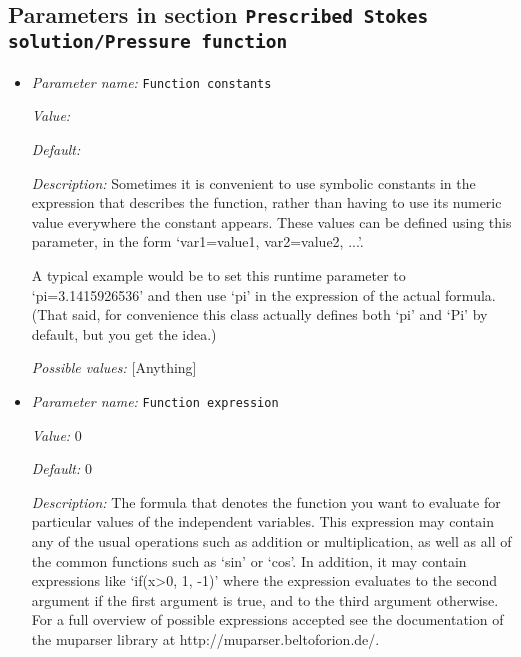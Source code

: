 \subsection{Parameters in section \tt Prescribed Stokes solution/Pressure function}
\label{parameters:Prescribed_20Stokes_20solution/Pressure_20function}

\begin{itemize}
\item {\it Parameter name:} {\tt Function constants}
\label{parameters:Prescribed Stokes solution/Pressure function/Function constants}


{\it Value:} 


{\it Default:} 


{\it Description:} Sometimes it is convenient to use symbolic constants in the expression that describes the function, rather than having to use its numeric value everywhere the constant appears. These values can be defined using this parameter, in the form `var1=value1, var2=value2, ...'.

A typical example would be to set this runtime parameter to `pi=3.1415926536' and then use `pi' in the expression of the actual formula. (That said, for convenience this class actually defines both `pi' and `Pi' by default, but you get the idea.)


{\it Possible values:} [Anything]
\item {\it Parameter name:} {\tt Function expression}
\label{parameters:Prescribed Stokes solution/Pressure function/Function expression}


{\it Value:} 0


{\it Default:} 0


{\it Description:} The formula that denotes the function you want to evaluate for particular values of the independent variables. This expression may contain any of the usual operations such as addition or multiplication, as well as all of the common functions such as `sin' or `cos'. In addition, it may contain expressions like `if(x>0, 1, -1)' where the expression evaluates to the second argument if the first argument is true, and to the third argument otherwise. For a full overview of possible expressions accepted see the documentation of the muparser library at http://muparser.beltoforion.de/.


\end{itemize}
